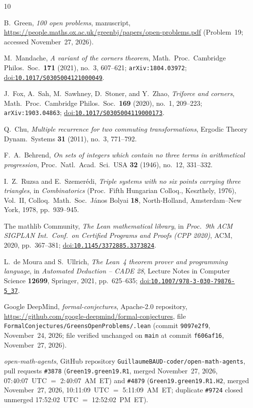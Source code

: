 \documentclass[11pt,reqno]{amsart}
\theoremstyle{remark}
\newcommand{\LeanUS}{\textunderscore\hspace{0pt}}
\newcommand{\lean}[1]{{\let\_\LeanUS\texttt{#1}}}
\newcommand{\doi}[1]{\href{https://doi.org/#1}{doi:\nolinkurl{#1}}}
\begin{document}
\begin{thebibliography}{10}

B.~Green, \emph{100 open problems}, manuscript, \url{https://people.maths.ox.ac.uk/greenbj/papers/open-problems.pdf} (Problem~19; accessed November~27, 2026).

M.~Mandache, \emph{A variant of the corners theorem}, Math.\ Proc.\ Cambridge Philos.\ Soc.\ \textbf{171} (2021), no.~3, 607--621; \lean{arXiv:1804.03972}; \doi{10.1017/S0305004121000049}.

J.~Fox, A.~Sah, M.~Sawhney, D.~Stoner, and Y.~Zhao, \emph{Triforce and corners}, Math.\ Proc.\ Cambridge Philos.\ Soc.\ \textbf{169} (2020), no.~1, 209--223; \lean{arXiv:1903.04863}; \doi{10.1017/S0305004119000173}.

Q.~Chu, \emph{Multiple recurrence for two commuting transformations}, Ergodic Theory Dynam.\ Systems \textbf{31} (2011), no.~3, 771--792.

F.~A.~Behrend, \emph{On sets of integers which contain no three terms in arithmetical progression}, Proc.\ Natl.\ Acad.\ Sci.\ USA \textbf{32} (1946), no.~12, 331--332.

I.~Z.~Ruzsa and E.~Szemer\'edi, \emph{Triple systems with no six points carrying three triangles}, in \emph{Combinatorics} (Proc.\ Fifth Hungarian Colloq., Keszthely, 1976), Vol.~II, Colloq.\ Math.\ Soc.\ J\'anos Bolyai \textbf{18}, North-Holland, Amsterdam--New York, 1978, pp.~939--945.

The mathlib Community, \emph{The Lean mathematical library}, in \emph{Proc.\ 9th ACM SIGPLAN Int.\ Conf.\ on Certified Programs and Proofs (CPP 2020)}, ACM, 2020, pp.~367--381; \doi{10.1145/3372885.3373824}.

L.~de Moura and S.~Ullrich, \emph{The Lean~4 theorem prover and programming language}, in \emph{Automated Deduction -- CADE 28}, Lecture Notes in Computer Science \textbf{12699}, Springer, 2021, pp.~625--635; \doi{10.1007/978-3-030-79876-5_37}.

Google DeepMind, \emph{formal-conjectures}, Apache-2.0 repository, \url{https://github.com/google-deepmind/formal-conjectures}, file \lean{FormalConjectures/\allowbreak{}\allowbreak GreensOpenProblems/\allowbreak{}\allowbreak 19.\allowbreak{}lean} (commit \lean{9097e2f9}, November~24, 2026; file verified unchanged on \lean{main} at commit \lean{f606af16}, November~27, 2026).

\emph{open-math-agents}, GitHub repository \lean{GuillaumeBAUD-coder/\allowbreak{}open-math-agents}, pull requests \lean{\#3878} (\lean{Green19.\allowbreak{}green\_19.\allowbreak{}R1}, merged November~27, 2026, 07:40:07~UTC $=$ 2:40:07~AM~ET) and \lean{\#4879} (\lean{Green19.\allowbreak{}green\_19.\allowbreak{}R1.\allowbreak{}H2}, merged November~27, 2026, 10:11:09~UTC $=$ 5:11:09~AM~ET; duplicate \lean{\#9724} closed unmerged 17:52:02~UTC $=$ 12:52:02~PM~ET).

\end{thebibliography}
\end{document}
